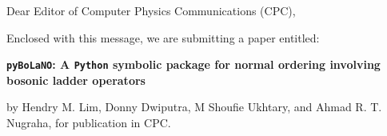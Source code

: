 \documentclass[aps,reprint,onecolumn,amsmath,amssymb,showpacs]{revtex4-1}
\begin{document}
\pagestyle{empty}

\begin{flushleft}

Dear Editor of Computer Physics Communications (CPC),
\vspace{10px}

Enclosed with this message, we are submitting a paper entitled:
\vspace{5px}

\textbf{\texttt{pyBoLaNO}: A \texttt{Python} symbolic package for normal ordering involving bosonic ladder operators}

\vspace{5px}

by Hendry M. Lim, Donny Dwiputra, M Shoufie Ukhtary, and Ahmad R. T. Nugraha, for publication in CPC.
\vspace{5px}

\end{flushleft} 
\end{document}
